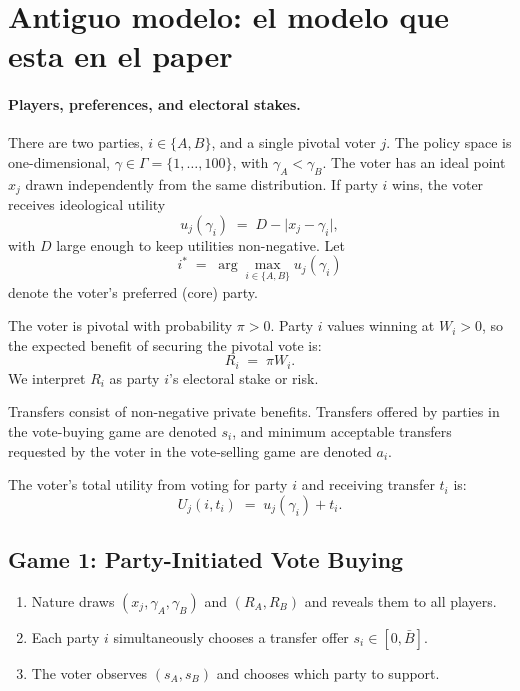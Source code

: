 \documentclass[11pt]{article}
\begin{document}
\section{Antiguo modelo: el modelo que esta en el paper}

\paragraph{Players, preferences, and electoral stakes.}

There are two parties, $i \in \{A,B\}$, and a single pivotal voter $j$. The policy space is one-dimensional, $\gamma \in \Gamma = \{1,\dots,100\}$, with $\gamma_A < \gamma_B$. The voter has an ideal point $x_j$ drawn independently from the same distribution. If party $i$ wins, the voter receives ideological utility
\begin{equation}
u_j(\gamma_i) \;=\; D - \lvert x_j - \gamma_i \rvert,
\end{equation}
with $D$ large enough to keep utilities non-negative. Let
\begin{equation}
i^\ast \;=\; \arg\max_{i \in \{A,B\}} u_j(\gamma_i)
\end{equation}
denote the voter's preferred (core) party.

The voter is pivotal with probability $\pi>0$. Party $i$ values winning at $W_i>0$, so the expected benefit of securing the pivotal vote is:
\begin{equation}
R_i \;=\; \pi W_i.
\end{equation}
We interpret $R_i$ as party $i$'s electoral stake or risk.

Transfers consist of non-negative private benefits. Transfers offered by parties in the vote-buying game are denoted $s_i$, and minimum acceptable transfers requested by the voter in the vote-selling game are denoted $a_i$.

The voter's total utility from voting for party $i$ and receiving transfer $t_i$ is:
\begin{equation}
U_j(i,t_i) \;=\; u_j(\gamma_i) + t_i.
\end{equation}

\subsection*{Game 1: Party-Initiated Vote Buying}

\begin{enumerate}
\item Nature draws $(x_j,\gamma_A,\gamma_B)$ and $(R_A,R_B)$ and reveals them to all players.
\item Each party $i$ simultaneously chooses a transfer offer $s_i \in [0,\bar{B}]$.
\item The voter observes $(s_A,s_B)$ and chooses which party to support.
\end{enumerate}
\end{document}
